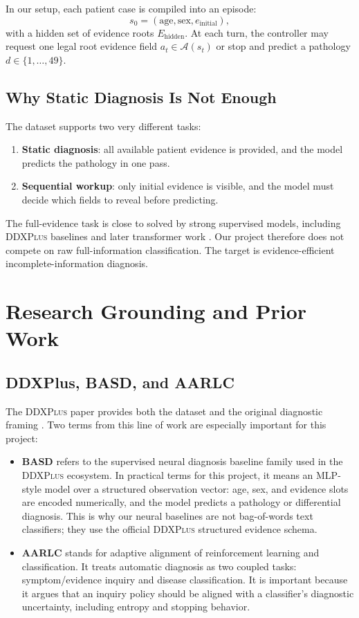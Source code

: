\documentclass[11pt]{article}
\newcommand{\ddx}{\textsc{DDXPlus}}
\begin{document}
In our setup, each patient case is compiled into an episode:
\[
s_0 = (\text{age}, \text{sex}, e_{\text{initial}}),
\]
with a hidden set of evidence roots $E_{\text{hidden}}$. At each turn, the controller may request one legal root evidence field $a_t \in \mathcal{A}(s_t)$ or stop and predict a pathology $d \in \{1,\ldots,49\}$.

\subsection{Why Static Diagnosis Is Not Enough}

The dataset supports two very different tasks:
\begin{enumerate}[leftmargin=*]
    \item \textbf{Static diagnosis}: all available patient evidence is provided, and the model predicts the pathology in one pass.
    \item \textbf{Sequential workup}: only initial evidence is visible, and the model must decide which fields to reveal before predicting.
\end{enumerate}

The full-evidence task is close to solved by strong supervised models, including \ddx{} baselines and later transformer work \cite{ddxplus,ddxt}. Our project therefore does not compete on raw full-information classification. The target is evidence-efficient incomplete-information diagnosis.

\section{Research Grounding and Prior Work}

\subsection{DDXPlus, BASD, and AARLC}

The \ddx{} paper provides both the dataset and the original diagnostic framing \cite{ddxplus}. Two terms from this line of work are especially important for this project:
\begin{itemize}[leftmargin=*]
    \item \textbf{BASD} refers to the supervised neural diagnosis baseline family used in the \ddx{} ecosystem. In practical terms for this project, it means an MLP-style model over a structured observation vector: age, sex, and evidence slots are encoded numerically, and the model predicts a pathology or differential diagnosis. This is why our neural baselines are not bag-of-words text classifiers; they use the official \ddx{} structured evidence schema.
    \item \textbf{AARLC} stands for adaptive alignment of reinforcement learning and classification. It treats automatic diagnosis as two coupled tasks: symptom/evidence inquiry and disease classification. It is important because it argues that an inquiry policy should be aligned with a classifier's diagnostic uncertainty, including entropy and stopping behavior.
\end{itemize}
\end{document}
